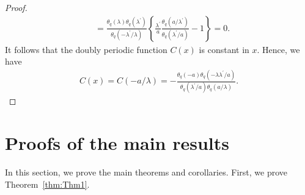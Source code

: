 \documentclass[pdftex]{sigma}
\numberwithin{equation}{section}
\theoremstyle{definition}
\begin{document}
\begin{proof}
\begin{align*}
&=\frac{\theta_q(\lambda)\theta_q(\lambda^{\prime})}{\theta_q(-\lambda^{\prime}/\lambda)}\left\{\frac{\lambda^{\prime}}{a} \frac{\theta_q(a/\lambda^{\prime})}{\theta_q(\lambda^{\prime}/a)}-1\right\}=0.
\end{align*}
It follows that the doubly periodic function $C(x)$ is constant in $x$.
Hence, we have
\begin{gather*}
C(x)=C(-a/\lambda)=-\frac{\theta_q(-a)\theta_q(-\lambda\lambda^{\prime}/a)}{\theta_q(\lambda^{\prime}/a)\theta_q(a/\lambda)}.\tag*{\qed}
\end{gather*}\renewcommand{\qed}{}
\end{proof}

\section{Proofs of the main results}\label{section3}
In this section, we prove the main theorems and corollaries.
First, we prove Theorem~\ref{thm:Thm1}.
\end{document}
